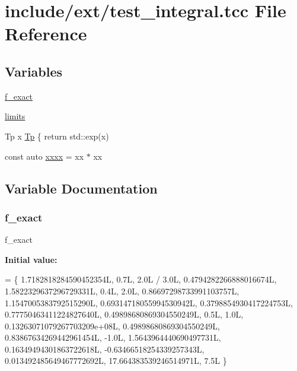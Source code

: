 \hypertarget{test__integral_8tcc}{}\section{include/ext/test\+\_\+integral.tcc File Reference}
\label{test__integral_8tcc}
\subsection*{Variables}
\begin{DoxyCompactItemize}
\item 
\hyperlink{test__integral_8tcc_ac976a7672df8a7a03bec324e352ed050}{f\+\_\+exact}
\item 
\hyperlink{test__integral_8tcc_a5e4cbe559ff3391639d856f01555e49c}{limits}
\item 
Tp x \hyperlink{test__integral_8tcc_a82f489a4943d33943d0b0f781a801283}{Tp} \{ return std\+::exp(x)
\item 
const auto \hyperlink{test__integral_8tcc_a5fd7931fa6dce812fd079739582dcd8d}{xxxx} = xx $\ast$ xx
\end{DoxyCompactItemize}


\subsection{Variable Documentation}
\mbox{\label{test__integral_8tcc_ac976a7672df8a7a03bec324e352ed050}} 
\subsubsection{\texorpdfstring{f\+\_\+exact}{f\_exact}}
{\footnotesize\ttfamily f\+\_\+exact}

{\bfseries Initial value\+:}
\begin{DoxyCode}
= \{
    1.7182818284590452354L,
    0.7L,
    2.0L / 3.0L,
    0.4794282266888016674L,
    1.5822329637296729331L,
    0.4L,
    2.0L,
    0.86697298733991103757L,
    1.1547005383792515290L,
    0.69314718055994530942L,
    0.3798854930417224753L,
    0.77750463411224827640L,
    0.49898680869304550249L,
    0.5L,
    1.0L,
    0.13263071079267703209e+08L,
    0.49898680869304550249L,
    0.83867634269442961454L,
    -1.0L,
    1.5643964440690497731L,
    0.16349494301863722618L,
    -0.63466518254339257343L,
    0.013492485649467772692L,
    17.664383539246514971L,
    7.5L \}
\end{DoxyCode}


